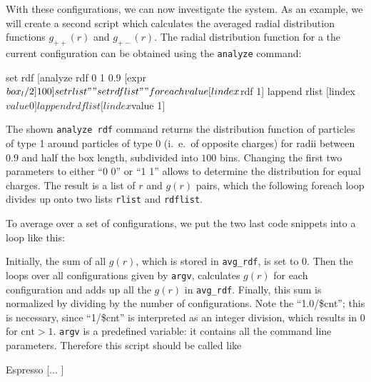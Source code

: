 With these configurations, we can now investigate the system. As an example, we
will create a second script which calculates the averaged radial distribution
functions $g_{++}(r)$ and $g_{+-}(r)$. The radial distribution function for a
the current configuration can be obtained using the \verb|analyze| command:
\begin{tclcode}
set rdf [analyze rdf 0 1 0.9 [expr $box_l/2] 100]
set rlist ""
set rdflist ""
foreach value [lindex $rdf 1] {
  lappend rlist   [lindex $value 0]
  lappend rdflist [lindex $value 1] 
}
\end{tclcode}
The shown \verb|analyze rdf| command returns the distribution function of
particles of type 1 around particles of type 0 (i.~e.\ of opposite charges) for
radii between $0.9$ and half the box length, subdivided into $100$ bins.
Changing the first two parameters to either ``0 0'' or ``1 1'' allows to
determine the distribution for equal charges. The result is a list of $r$ and
$g(r)$ pairs, which the following foreach loop divides up onto two lists
\verb|rlist| and \verb|rdflist|.

To average over a set of configurations, we put the two last code snippets into
a loop like this:
Initially, the sum of all $g(r)$, which is stored in \verb|avg_rdf|, is set to
0.  Then the loops over all configurations given by \verb|argv|, calculates
$g(r)$ for each configuration and adds up all the $g(r)$ in \verb|avg_rdf|.
Finally, this sum is normalized by dividing by the number of
configurations. Note the ``1.0/\$cnt''; this is necessary, since ``1/\$cnt'' is
interpreted as an integer division, which results in 0 for $\text{cnt}>1$.
\verb|argv| is a predefined variable: it contains all the command line
parameters. Therefore this script should be called like
\begin{code}
Espresso  [... ]
\end{code}

